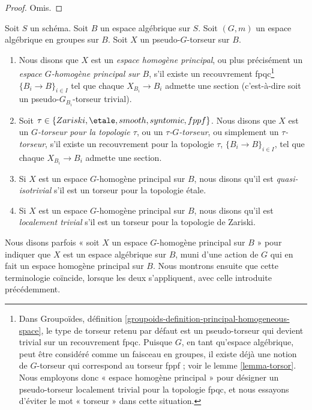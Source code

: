 \begin{proof}
Omis.
\end{proof}

\begin{definition}
\label{definition-principal-homogeneous-space}
Soit $S$ un schéma. Soit $B$ un espace algébrique sur $S$. Soit $(G, m)$ un espace algébrique en groupes sur $B$. Soit $X$ un pseudo-$G$-torseur sur $B$.
\begin{enumerate}
\item Nous disons que $X$ est un {\it espace homogène principal}, ou plus précisément un {\it espace $G$-homogène principal sur $B$}, s'il existe un recouvrement fpqc\footnote{Dans Groupoïdes, définition \ref{groupoids-definition-principal-homogeneous-space}, le type de torseur retenu par défaut est un pseudo-torseur qui devient trivial sur un recouvrement fpqc. Puisque $G$, en tant qu'espace algébrique, peut être considéré comme un faisceau en groupes, il existe déjà une notion de $G$-torseur qui correspond au torseur fppf ; voir le lemme \ref{lemma-torsor}. Nous employons donc « espace homogène principal » pour désigner un pseudo-torseur localement trivial pour la topologie fpqc, et nous essayons d'éviter le mot « torseur » dans cette situation.} $\{B_i \to B\}_{i \in I}$ tel que chaque $X_{B_i} \to B_i$ admette une section (c'est-à-dire soit un pseudo-$G_{B_i}$-torseur trivial).
\item Soit $\tau \in \{Zariski, \etale, smooth, syntomic, fppf\}$. Nous disons que $X$ est un {\it $G$-torseur pour la topologie $\tau$}, ou un {\it $\tau$-$G$-torseur}, ou simplement un {\it $\tau$-torseur}, s'il existe un recouvrement pour la topologie $\tau$, $\{B_i \to B\}_{i \in I}$, tel que chaque $X_{B_i} \to B_i$ admette une section.
\item Si $X$ est un espace $G$-homogène principal sur $B$, nous disons qu'il est {\it quasi-isotrivial} s'il est un torseur pour la topologie étale.
\item Si $X$ est un espace $G$-homogène principal sur $B$, nous disons qu'il est {\it localement trivial} s'il est un torseur pour la topologie de Zariski.
\end{enumerate}
\end{definition}

\noindent
Nous disons parfois « soit $X$ un espace $G$-homogène principal sur $B$ » pour indiquer que $X$ est un espace algébrique sur $B$, muni d'une action de $G$ qui en fait un espace homogène principal sur $B$. Nous montrons ensuite que cette terminologie coïncide, lorsque les deux s'appliquent, avec celle introduite précédemment.

